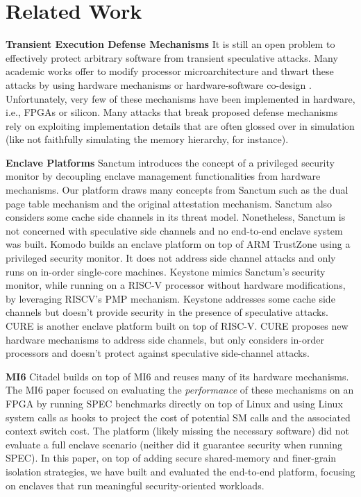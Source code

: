 \section{Related Work}
\textbf{Transient Execution Defense Mechanisms}
It is still an open problem to effectively protect arbitrary software from transient speculative attacks.
Many academic works offer to modify processor microarchitecture and thwart these attacks by using hardware mechanisms or hardware-software co-design \cite{ainsworth2020muontrap, cheang2019formal, canella2019systematic, barber2019specshield, fustos2019spectreguard, yan2018invisispec, yu2019speculative, saileshwar2019cleanupspec, weisse2019nda, khasawneh2019safespec}.
Unfortunately, very few of these mechanisms have been implemented in hardware, i.e., FPGAs or silicon.
Many attacks that break proposed defense mechanisms rely on exploiting implementation details that are often glossed over in simulation (like not faithfully simulating the memory hierarchy, for instance).

\textbf{Enclave Platforms}
Sanctum \cite{costan2016sanctum} introduces the concept of a privileged security monitor by decoupling enclave management functionalities from hardware mechanisms. Our platform draws many concepts from Sanctum  such as the dual page table mechanism and the original attestation mechanism. Sanctum also considers some cache side channels in its threat model.
Nonetheless, Sanctum is not concerned with speculative side channels and no end-to-end enclave system was built.
Komodo \cite{ferraiuolo2017komodo} builds an enclave platform on top of ARM TrustZone \cite{trustzone04} using a privileged security monitor.
It does not address side channel attacks and only runs on in-order single-core machines.
Keystone \cite{lee2020keystone} mimics Sanctum's security monitor, while running on a RISC-V processor without hardware modifications, by leveraging RISCV's PMP mechanism.
Keystone addresses some cache side channels but doesn't provide security in the presence of speculative attacks.
CURE \cite{bahmani2021cure} is another enclave platform built on top of RISC-V. 
CURE proposes new hardware mechanisms to address side channels, but only considers in-order processors and doesn't protect against speculative side-channel attacks.

\textbf{MI6}
Citadel builds on top of MI6 \cite{bourgeat2019mi6} and reuses many of its hardware mechanisms. 
The MI6 paper focused on evaluating the \emph{performance} of these mechanisms on an FPGA
by running SPEC benchmarks directly on top of Linux and using Linux system calls as hooks to project the cost of potential SM calls and the associated context switch cost.
The platform (likely missing the necessary software) did not evaluate a full enclave scenario (neither did it guarantee security when running SPEC).
In this paper, on top of adding secure shared-memory and finer-grain isolation strategies, we have built and evaluated the end-to-end platform, focusing on enclaves that run meaningful security-oriented workloads.